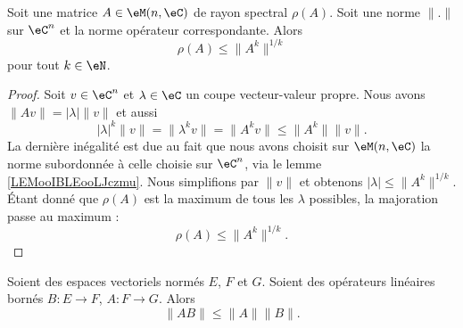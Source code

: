 \begin{proposition}      \label{PROPooKLFKooSVnDzr}
    Soit une matrice \( A\in \eM(n,\eC)\) de rayon spectral \( \rho(A)\). Soit une norme \( \| . \|\) sur \( \eC^n\) et la norme opérateur correspondante. Alors
    \begin{equation}
        \rho(A)\leq \| A^k \|^{1/k}
    \end{equation}
    pour tout \( k\in \eN\).
\end{proposition}

\begin{proof}
    Soit \( v\in \eC^n\) et \( \lambda\in \eC\) un coupe vecteur-valeur propre. Nous avons \( \| Av \|=| \lambda |\| v \|\) et aussi
    \begin{equation}
        | \lambda |^k\| v \|=\| \lambda^kv \|=\| A^kv \|\leq \| A^k \|\| v \|.
    \end{equation}
    La dernière inégalité est due au fait que nous avons choisit sur \( \eM(n,\eC)\) la norme subordonnée à celle choisie sur \( \eC^n\), via le lemme \ref{LEMooIBLEooLJczmu}. Nous simplifions par \( \| v \|\) et obtenons \( | \lambda |\leq \| A^k \|^{1/k}\). Étant donné que \( \rho(A)\) est la maximum de tous les \( \lambda\) possibles, la majoration passe au maximum :
    \begin{equation}
        \rho(A)\leq \| A^k \|^{1/k}.
    \end{equation}
\end{proof}

\begin{lemma}   \label{LEMooFITMooBBBWGI}
    Soient des espaces vectoriels normés \( E\), \( F\) et \( G\). Soient des opérateurs linéaires bornés \( B\colon E\to F\), \( A\colon F\to G\). Alors
    \begin{equation}
        \| AB \|\leq \| A \|\| B \|.
    \end{equation}
\end{lemma}


